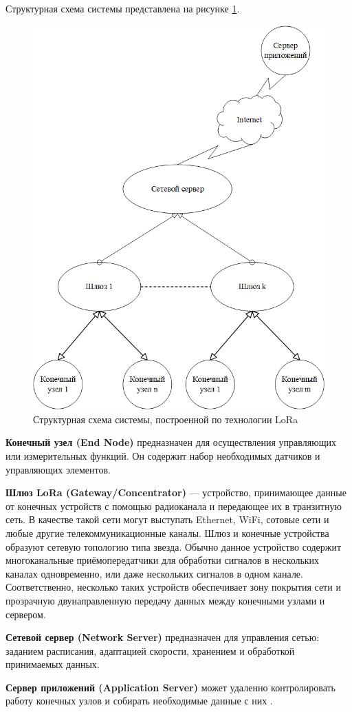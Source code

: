 Структурная схема системы представлена на рисунке
\ref{fig:LoRa}.
\begin{figure}[h]
	\centering\includegraphics[width=0.7\linewidth]{img/LoRa}
	\caption{Структурная схема системы, построенной по технологии LoRa}
	\label{fig:LoRa}
\end{figure}


\textbf{Конечный узел (End Node) }предназначен для осуществления управляющих или измерительных функций. Он содержит набор необходимых датчиков и управляющих элементов.

\textbf{Шлюз LoRa (Gateway/Concentrator)} — устройство, принимающее данные от конечных устройств с помощью радиоканала и передающее их в транзитную сеть. В качестве такой сети могут выступать Ethernet, WiFi, сотовые сети и любые другие телекоммуникационные каналы. Шлюз и конечные устройства образуют сетевую топологию типа звезда. Обычно данное устройство содержит многоканальные приёмопередатчики для обработки сигналов в нескольких каналах одновременно, или даже нескольких сигналов в одном канале. Соответственно, несколько таких устройств обеспечивает зону покрытия сети и прозрачную двунаправленную передачу данных между конечными узлами и сервером.

\textbf{Сетевой сервер (Network Server)} предназначен для управления сетью: заданием расписания, адаптацией скорости, хранением и обработкой принимаемых данных.

\textbf{Сервер приложений (Application Server)} может удаленно контролировать работу конечных узлов и собирать необходимые данные с них \cite{1}.

